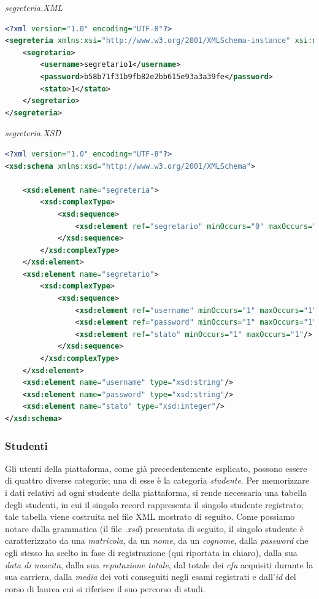 \documentclass [a4paper,11pt]{book}
\begin{document}
\emph{segreteria.XML}

\begin{lstlisting}[language=XML]
<?xml version="1.0" encoding="UTF-8"?>
<segreteria xmlns:xsi="http://www.w3.org/2001/XMLSchema-instance" xsi:noNamespaceSchemaLocation="segreteria.xsd">
    <segretario>
        <username>segretario1</username>
        <password>b58b71f31b9fb82e2bb615e93a3a39fe</password>
        <stato>1</stato>
    </segretario>
</segreteria>
\end{lstlisting}

\emph{segreteria.XSD}

\begin{lstlisting}[language=XML]
<?xml version="1.0" encoding="UTF-8"?>
<xsd:schema xmlns:xsd="http://www.w3.org/2001/XMLSchema">

    <xsd:element name="segreteria">
        <xsd:complexType>
            <xsd:sequence>
                <xsd:element ref="segretario" minOccurs="0" maxOccurs="unbounded" />
            </xsd:sequence>
        </xsd:complexType>
    </xsd:element>
    <xsd:element name="segretario">
        <xsd:complexType>
            <xsd:sequence>
                <xsd:element ref="username" minOccurs="1" maxOccurs="1"/>
                <xsd:element ref="password" minOccurs="1" maxOccurs="1"/>
                <xsd:element ref="stato" minOccurs="1" maxOccurs="1"/>
            </xsd:sequence>
        </xsd:complexType>
    </xsd:element>
    <xsd:element name="username" type="xsd:string"/>
    <xsd:element name="password" type="xsd:string"/>
    <xsd:element name="stato" type="xsd:integer"/>
</xsd:schema>
\end{lstlisting}

\medskip

\subsubsection{Studenti}

Gli utenti della piattaforma, come già precedentemente esplicato, possono essere di quattro diverse categorie; una di esse è la categoria \emph{studente}. Per memorizzare i dati relativi ad ogni studente della piattaforma, si rende necessaria una tabella degli studenti, in cui il singolo record rappresenta il singolo studente registrato; tale tabella viene costruita nel file XML mostrato di seguito. Come possiamo notare dalla grammatica (il file \emph{.xsd}) presentata di seguito, il singolo studente è caratterizzato da una \emph{matricola}, da un \emph{nome}, da un \emph{cognome}, dalla \emph{password} che egli stesso ha scelto in fase di registrazione (qui riportata in chiaro), dalla sua \emph{data di nascita}, dalla sua \emph{reputazione totale}, dal totale dei \emph{cfu} acquisiti durante la sua carriera, dalla \emph{media} dei voti conseguiti negli esami registrati e dall'\emph{id} del corso di laurea cui si riferisce il suo percorso di studi.
\end{document}
